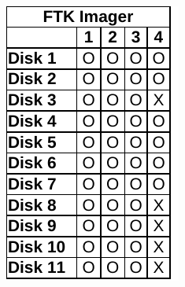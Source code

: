 \begin{paraphrase}
\begin{figure}
\begin{subfigure}{0.17\linewidth}
        \includegraphics[width=\linewidth]{fig/ftk_results_fat.pdf}
    \end{subfigure}~~
    \begin{subfigure}{0.17\linewidth}

\end{subfigure}
\end{figure}
\end{paraphrase}
